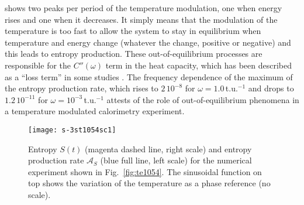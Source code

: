 \documentclass[pre,a4paper,twocolumn,superscriptaddress,%
floatfix]{revtex4}
\begin{document}
shows two peaks per period of the temperature modulation, one when energy
rises and one when it decreases. It simply means that the modulation of the
temperature is too fast to allow the system to stay in equilibrium when
temperature and energy change (whatever the change, positive or negative) and
this leads to entropy production.
These out-of-equilibrium processes are
responsible for the $C''(\omega)$ term in the heat capacity, which has been
described as a ``loss term'' in some studies \cite{GARDEN-REVIEW}.
The frequency dependence of the maximum of the entropy production rate, which
rises to $2\,10^{-8}$ for $\omega = 1.0\,$t.u.$^{-1}$ and
drops to $1.2\,10^{-11}$ for $\omega = 10^{-3}\,$t.u.$^{-1}$
attests of the role of out-of-equilibrium phenomena in a
temperature modulated calorimetry experiment.

\begin{figure}[h]
  \centering
  \texttt{[image: s-3st1054sc1]}
  \caption{Entropy $S(t)$ (magenta dashed line, right scale)
    and entropy production rate
    $\mathcal{A}_S$ (blue full line, left scale)
    for the numerical experiment shown in Fig.~\ref{fig:te1054}.
    The sinusoidal function on top shows the variation
    of the temperature as a phase reference (no scale).}
  \label{fig:entropy}
\end{figure}
\end{document}
